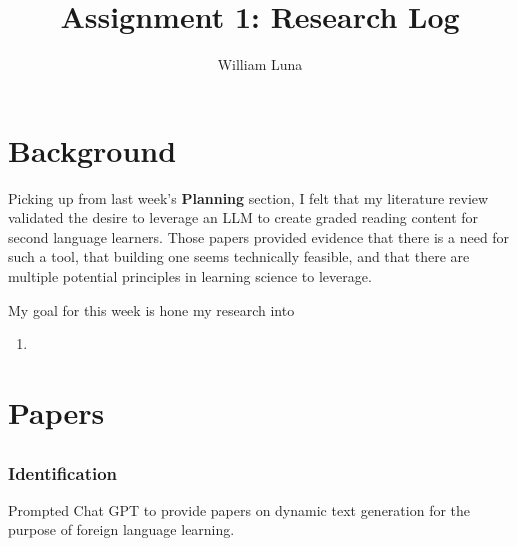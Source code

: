 \documentclass[
	letterpaper, %
]{jdf}
\author{William Luna}
\title{Assignment 1: Research Log}
\begin{document}

\maketitle

\section{Background}
Picking up from last week's \textbf{Planning} section, I felt that my literature review validated the desire to leverage an LLM to create graded reading content for second language learners. Those papers provided evidence that there is a need for such a tool, that building one seems technically feasible, and that there are multiple potential principles in learning science to leverage.

My goal for this week is hone my research into 

\begin{enumerate}
    \item 
\end{enumerate}

\section{Papers}

\subsection{}
\subsubsection{Identification}
Prompted Chat GPT to provide papers on dynamic text generation for the purpose of foreign language learning.
\end{document}
